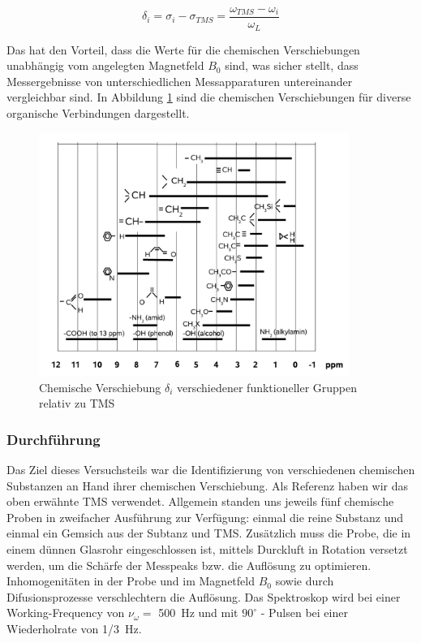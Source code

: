 \documentclass[a4paper]{scrartcl} %
\begin{document}
\begin{equation}
	\delta_i = \sigma_i -\sigma_{TMS} = \frac{\omega_{TMS} - \omega_i}{\omega_L}
	\label{eq:delta_i}
\end{equation}

Das hat den Vorteil, dass die Werte für die chemischen Verschiebungen unabhängig vom angelegten Magnetfeld $B_0$ sind, was sicher stellt, dass Messergebnisse von unterschiedlichen Messapparaturen untereinander vergleichbar sind.
In Abbildung \ref{fig:chem_shift} sind die chemischen Verschiebungen für diverse organische Verbindungen dargestellt. 

\begin{figure}[htbp]
	\centering
	\includegraphics[width= 0.9\textwidth]{./Resources/chem_shifts.png}
	\caption{Chemische Verschiebung $\delta_i$ verschiedener funktioneller Gruppen relativ zu TMS}
	\label{fig:chem_shift}
\end{figure}


\subsubsection{Durchführung}

Das Ziel dieses Versuchsteils war die Identifizierung von verschiedenen chemischen Substanzen an Hand ihrer chemischen Verschiebung. Als Referenz haben wir das oben erwähnte TMS verwendet. Allgemein standen uns jeweils fünf chemische Proben in zweifacher Ausführung zur Verfügung: einmal die reine Substanz und einmal ein Gemsich aus der Subtanz und TMS. Zusätzlich muss die Probe, die in einem dünnen Glasrohr eingeschlossen ist, mittels Durckluft in Rotation versetzt werden, um die Schärfe der Messpeaks bzw. die Auflösung zu optimieren. Inhomogenitäten in der Probe und im Magnetfeld $B_0$ sowie durch Difusionsprozesse verschlechtern die Auflösung. Das Spektroskop wird bei einer Working-Frequency von $\nu_{\omega} = $ \SI{500}{Hz} und mit $90^{\circ}$ - Pulsen bei einer Wiederholrate von \SI{1/3}{Hz}.
\end{document}
